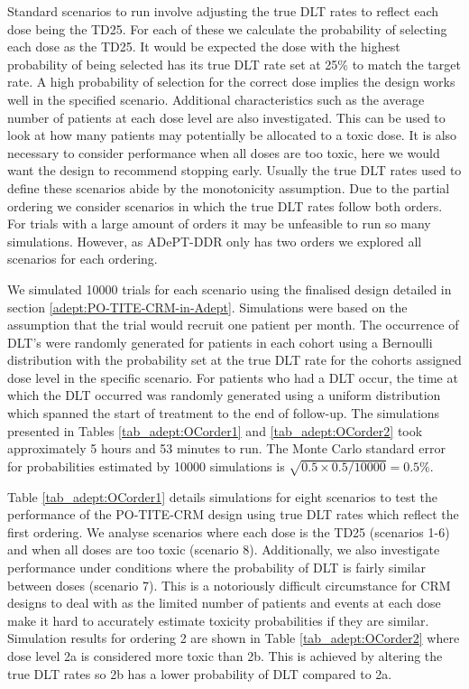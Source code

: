Standard scenarios to run involve adjusting the true DLT rates to reflect each dose being the TD25. For each of these we calculate the probability of selecting each dose as the TD25. It would be expected the dose with the highest probability of being selected has its true DLT rate set at 25\% to match the target rate. A high probability of selection for the correct dose implies the design works well in the specified scenario. Additional characteristics such as the average number of patients at each dose level are also investigated. This can be used to look at how many patients may potentially be allocated to a toxic dose. It is also necessary to consider performance when all doses are too toxic, here we would want the design to recommend stopping early. Usually the true DLT rates used to define these scenarios abide by the monotonicity assumption. Due to the partial ordering we consider scenarios in which the true DLT rates follow both orders. For trials with a large amount of orders it may be unfeasible to run so many simulations. However, as ADePT-DDR only has two orders we explored all scenarios for each ordering.

We simulated 10000 trials for each scenario using the finalised design detailed in section \ref{adept:PO-TITE-CRM-in-Adept}. Simulations were based on the assumption that the trial would recruit one patient per month. The occurrence of DLT's were randomly generated for patients in each cohort using a Bernoulli distribution with the probability set at the true DLT rate for the cohorts assigned dose level in the specific scenario. For patients who had a DLT occur, the time at which the DLT occurred was randomly generated using a uniform distribution which spanned the start of treatment to the end of follow-up. The simulations presented in Tables \ref{tab_adept:OCorder1} and \ref{tab_adept:OCorder2} took approximately 5 hours and 53 minutes to run. The Monte Carlo standard error for probabilities estimated by 10000 simulations is $\sqrt{0.5 \times 0.5/10000} = 0.5\%$.

Table \ref{tab_adept:OCorder1} details simulations for eight scenarios to test the performance of the PO-TITE-CRM design using true DLT rates which reflect the first ordering. We analyse scenarios where each dose is the TD25 (scenarios 1-6) and when all doses are too toxic (scenario 8). Additionally, we also investigate performance under conditions where the probability of DLT is fairly similar between doses (scenario 7). This is a notoriously difficult circumstance for CRM designs to deal with as the limited number of patients and events at each dose make it hard to accurately estimate toxicity probabilities if they are similar. Simulation results for ordering 2 are shown in Table \ref{tab_adept:OCorder2} where dose level 2a is considered more toxic than 2b. This is achieved by altering the true DLT rates so 2b has a lower probability of DLT compared to 2a. 

